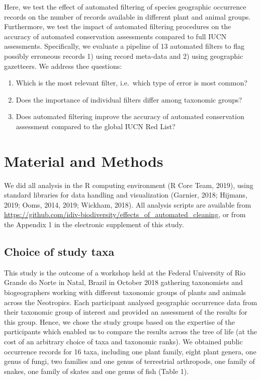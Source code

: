 \documentclass[
  12pt,
]{article}
\providecommand{\tightlist}{%
  \setlength{\itemsep}{0pt}\setlength{\parskip}{0pt}}
\begin{document}
Here, we test the effect of automated filtering of species geographic occurrence records on the number of records available in different plant and animal groups. Furthermore, we test the impact of automated filtering procedures on the accuracy of automated conservation assessments compared to full IUCN assessments. Specifically, we evaluate a pipeline of 13 automated filters to flag possibly erroneous records 1) using record meta-data and 2) using geographic gazetteers. We address thee questions:

\begin{enumerate}
\def\labelenumi{\arabic{enumi}.}
\tightlist
\item
  Which is the most relevant filter, i.e.~which type of error is most common?
\item
  Does the importance of individual filters differ among taxonomic groups?
\item
  Does automated filtering improve the accuracy of automated conservation assessment compared to the global IUCN Red List?
\end{enumerate}

\hypertarget{material-and-methods}{%
\section{Material and Methods}\label{material-and-methods}}

We did all analysis in the R computing environment (R Core Team, 2019), using standard libraries for data handling and visualization (Garnier, 2018; Hijmans, 2019; Ooms, 2014, 2019; Wickham, 2018). All analysis scripts are available from \url{https://github.com/idiv-biodiversity/effects_of_automated_cleaning}, or from the Appendix 1 in the electronic supplement of this study.

\hypertarget{choice-of-study-taxa}{%
\subsection{Choice of study taxa}\label{choice-of-study-taxa}}

This study is the outcome of a workshop held at the Federal University of Rio Grande do Norte in Natal, Brazil in October 2018 gathering taxonomists and biogeographers working with different taxonomic groups of plants and animals across the Neotropics. Each participant analysed geographic occurrence data from their taxonomic group of interest and provided an assessment of the results for this group. Hence, we chose the study groups based on the expertise of the participants which enabled us to compare the results across the tree of life (at the cost of an arbitrary choice of taxa and taxonomic ranks). We obtained public occurrence records for 16 taxa, including one plant family, eight plant genera, one genus of fungi, two families and one genus of terrestrial arthropods, one family of snakes, one family of skates and one genus of fish (Table 1).
\end{document}
